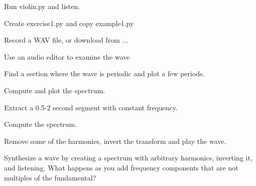 \documentclass[12pt]{book}
\begin{document}
\begin{exercise}
Run violin.py and listen.
\end{exercise}

\begin{exercise}
Create exercise1.py and copy example1.py

Record a WAV file, or download from ...

Use an audio editor to examine the wave

Find a section where the wave is periodic and plot a few periods.

Compute and plot the spectrum.
\end{exercise}

\begin{exercise}
Extract a 0.5-2 second segment with constant frequency.

Compute the spectrum.

Remove some of the harmonics, invert the transform and play the wave.
\end{exercise}

\begin{exercise}
Synthesize a wave by creating a spectrum with arbitrary harmonics,
inverting it, and listening.  What happens as you add frequency
components that are not multiples of the fundamental?
\end{exercise}
\end{document}
